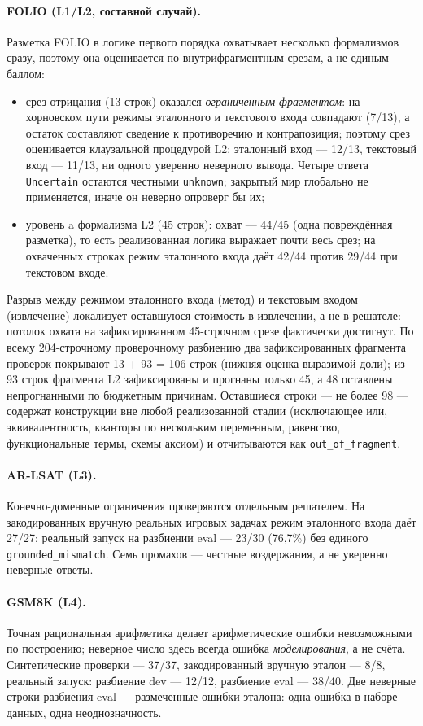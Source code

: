 \documentclass[11pt,a4paper]{article}
\begin{document}
\paragraph{FOLIO (L1/L2, составной случай).} Разметка FOLIO в логике первого порядка охватывает несколько формализмов сразу,
поэтому она оценивается по внутрифрагментным срезам, а не единым баллом:
\begin{itemize}
	\item срез отрицания (13 строк) оказался \emph{ограниченным фрагментом}: на хорновском пути режимы эталонного и текстового входа совпадают (7/13), а остаток составляют сведение к противоречию и контрапозиция; поэтому срез оценивается клаузальной процедурой L2: эталонный вход — 12/13, текстовый вход — 11/13, ни одного уверенно неверного вывода. Четыре ответа \texttt{Uncertain} остаются честными \texttt{unknown}; закрытый мир глобально не применяется, иначе он неверно опроверг бы их;
	\item уровень a формализма L2 (45 строк): охват — 44/45 (одна повреждённая разметка), то есть реализованная логика выражает почти весь срез; на охваченных строках режим эталонного входа даёт 42/44 против 29/44 при текстовом входе.
\end{itemize}
Разрыв между режимом эталонного входа (метод) и текстовым входом (извлечение) локализует оставшуюся стоимость в извлечении,
а не в решателе: потолок охвата на зафиксированном 45-строчном срезе фактически достигнут. По всему 204-строчному проверочному
разбиению два зафиксированных фрагмента проверок покрывают 13 + 93 = 106 строк (нижняя оценка выразимой доли); из 93
строк фрагмента L2 зафиксированы и прогнаны только 45, а 48 оставлены непрогнанными по бюджетным причинам. Оставшиеся
строки — не более 98 — содержат конструкции вне любой реализованной стадии (исключающее или, эквивалентность, кванторы
по нескольким переменным, равенство, функциональные термы, схемы аксиом) и отчитываются как \texttt{out\_of\_fragment}.

\paragraph{AR-LSAT (L3).} Конечно-доменные ограничения проверяются отдельным решателем. На закодированных вручную реальных
игровых задачах режим эталонного входа даёт 27/27; реальный запуск на разбиении eval — 23/30 (76{,}7\%) без единого
\texttt{grounded\_mismatch}. Семь промахов — честные воздержания, а не уверенно неверные ответы.

\paragraph{GSM8K (L4).} Точная рациональная арифметика делает арифметические ошибки невозможными по построению; неверное
число здесь всегда ошибка \emph{моделирования}, а не счёта. Синтетические проверки — 37/37, закодированный вручную
эталон — 8/8, реальный запуск: разбиение dev — 12/12, разбиение eval — 38/40. Две неверные строки разбиения eval
 — размеченные ошибки эталона: одна ошибка в наборе данных, одна неоднозначность.
\end{document}
